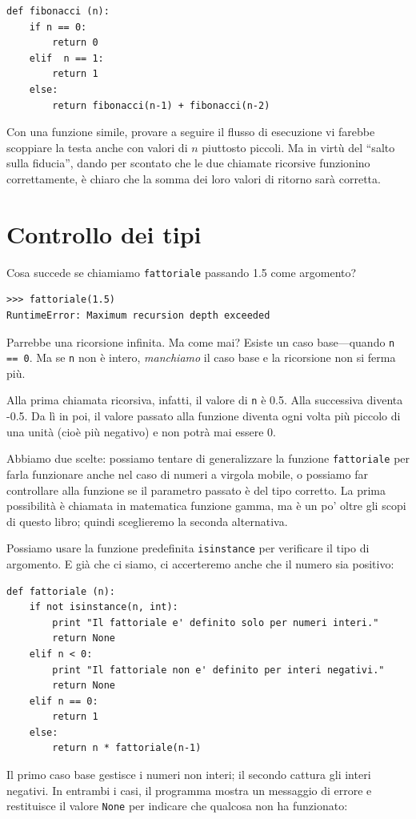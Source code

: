 \documentclass[10pt]{book}
\begin{document}
\begin{verbatim}
def fibonacci (n):
    if n == 0:
        return 0
    elif  n == 1:
        return 1
    else:
        return fibonacci(n-1) + fibonacci(n-2)
\end{verbatim}
%
Con una funzione simile, provare a seguire il flusso di esecuzione vi farebbe scoppiare la testa anche con valori di $n$ piuttosto piccoli. Ma in virtù del ``salto sulla fiducia'', dando per scontato che le due chiamate ricorsive funzionino correttamente, è chiaro che la somma dei loro valori di ritorno sarà corretta.


\section{Controllo dei tipi}
\label{guardian}

Cosa succede se chiamiamo {\tt fattoriale} passando 1.5 come argomento?

\begin{verbatim}
>>> fattoriale(1.5)
RuntimeError: Maximum recursion depth exceeded
\end{verbatim}
%
Parrebbe una ricorsione infinita. Ma come mai?
   Esiste un caso base---quando {\tt n == 0}.  Ma se {\tt n} non è intero,
{\em manchiamo} il caso base e la ricorsione non si ferma più.

Alla prima chiamata ricorsiva, infatti, il valore di {\tt n} è 0.5.
Alla successiva diventa -0.5. Da lì in poi, il valore passato alla funzione diventa ogni volta più piccolo di una unità (cioè più negativo) e non potrà mai essere 0.

Abbiamo due scelte: possiamo tentare di generalizzare la funzione {\tt fattoriale} per farla funzionare anche nel caso di numeri a virgola mobile, o possiamo far controllare alla funzione se il parametro passato è del tipo corretto. La prima possibilità è chiamata in matematica funzione gamma, ma è un po' oltre gli scopi di questo libro; quindi sceglieremo la seconda alternativa.

Possiamo usare la funzione predefinita {\tt isinstance} per verificare il tipo di argomento. E già che ci siamo, ci accerteremo anche che il numero sia positivo:

\begin{verbatim}
def fattoriale (n):
    if not isinstance(n, int):
        print "Il fattoriale e' definito solo per numeri interi."
        return None
    elif n < 0:
        print "Il fattoriale non e' definito per interi negativi."
        return None
    elif n == 0:
        return 1
    else:
        return n * fattoriale(n-1)
\end{verbatim}
%
Il primo caso base gestisce i numeri non interi; il secondo cattura gli interi negativi. In entrambi i casi, il programma mostra un messaggio di errore e restituisce il valore {\tt None} per indicare che qualcosa non ha funzionato:
\end{document}
